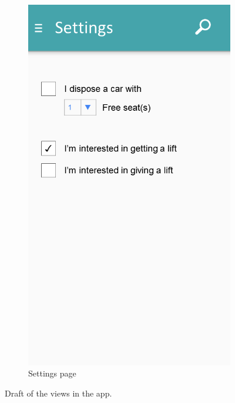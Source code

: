 \begin{figure}[h!]
\begin{subfigure}[b]{0.3\textwidth}
		\includegraphics[width=\textwidth]{figures/GUI-settings.png}
		\caption{Settings page}
		\label{fig:GUI-settings}
	\end{subfigure}
	\caption{Draft of the views in the app.}\label{fig:GUI-in-app}
\end{figure}


